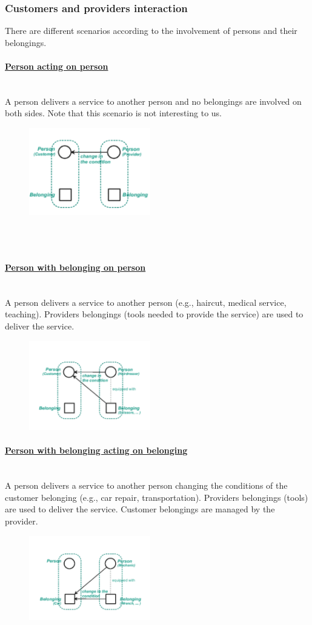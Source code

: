 \documentclass[10pt,a4paper]{article}
\newcommand{\myparagraph}[1]{\paragraph{\uline{#1}}\mbox{}\\[0.05in]}
\begin{document}
\subsubsection{Customers and providers interaction}
There are different scenarios according to the involvement of persons and their belongings.
\myparagraph{Person acting on person}
A person delivers a service to another person and no belongings are involved on both sides. Note that this scenario is not interesting to us.
\begin{figure}[h!]
 \hfill \includegraphics[width=150pt]{images/person-person}\hspace*{\fill}
  \label{fig:person-person}
\end{figure}\\ \\
\myparagraph{Person with belonging on person}
A person delivers a service to another person (e.g., haircut, medical service, teaching). Providers belongings (tools needed to provide the service) are used to deliver the service.
\begin{figure}[h!]
 \hfill \includegraphics[width=150pt]{images/person-b-person}\hspace*{\fill}
  \label{fig:person-b-person}
\end{figure}
\myparagraph{Person with belonging acting on belonging}
A person delivers a service to another person changing the conditions of the customer belonging (e.g., car repair, transportation). Providers belongings (tools) are used to deliver the service. Customer belongings are managed by the provider.
\begin{figure}[h!]
 \hfill \includegraphics[width=150pt]{images/person-belonging}\hspace*{\fill}
  \label{fig:person-belonging}
\end{figure}
\end{document}
